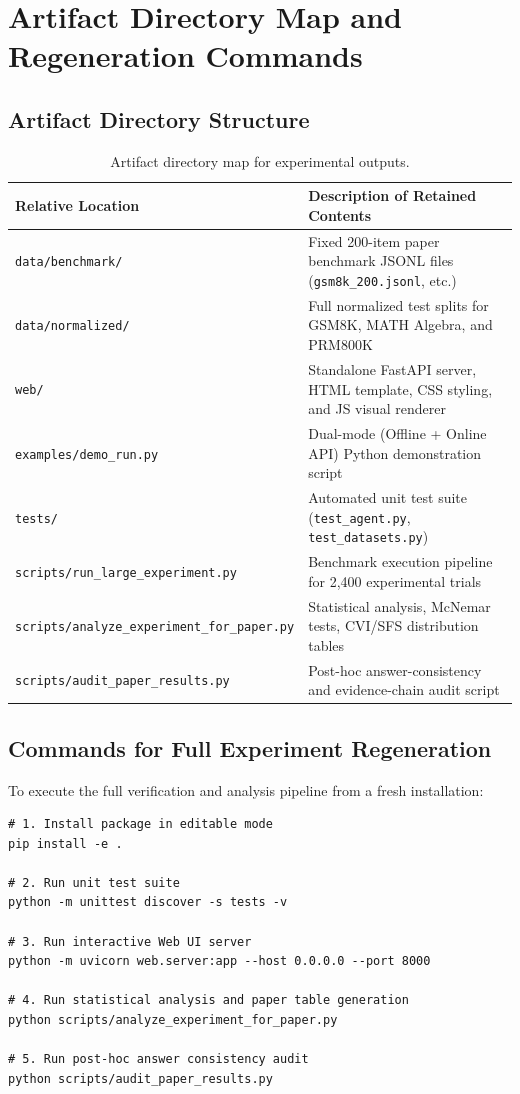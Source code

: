 \documentclass[11pt,letterpaper]{article}
\begin{document}
\section{Artifact Directory Map and Regeneration Commands}\label{sec:artifact-map}

\subsection{Artifact Directory Structure}
\begin{table}[htbp]
\centering
\small
\caption{Artifact directory map for experimental outputs.}
\label{tab:artifact-directory-map}
\begin{tabular}{ll}
\toprule
Relative Location & Description of Retained Contents \\
\midrule
\texttt{data/benchmark/} & Fixed 200-item paper benchmark JSONL files (\texttt{gsm8k\_200.jsonl}, etc.) \\
\texttt{data/normalized/} & Full normalized test splits for GSM8K, MATH Algebra, and PRM800K \\
\texttt{web/} & Standalone FastAPI server, HTML template, CSS styling, and JS visual renderer \\
\texttt{examples/demo\_run.py} & Dual-mode (Offline + Online API) Python demonstration script \\
\texttt{tests/} & Automated unit test suite (\texttt{test\_agent.py}, \texttt{test\_datasets.py}) \\
\texttt{scripts/run\_large\_experiment.py} & Benchmark execution pipeline for 2,400 experimental trials \\
\texttt{scripts/analyze\_experiment\_for\_paper.py} & Statistical analysis, McNemar tests, CVI/SFS distribution tables \\
\texttt{scripts/audit\_paper\_results.py} & Post-hoc answer-consistency and evidence-chain audit script \\
\bottomrule
\end{tabular}
\end{table}

\subsection{Commands for Full Experiment Regeneration}
To execute the full verification and analysis pipeline from a fresh installation:

\begin{verbatim}
# 1. Install package in editable mode
pip install -e .

# 2. Run unit test suite
python -m unittest discover -s tests -v

# 3. Run interactive Web UI server
python -m uvicorn web.server:app --host 0.0.0.0 --port 8000

# 4. Run statistical analysis and paper table generation
python scripts/analyze_experiment_for_paper.py

# 5. Run post-hoc answer consistency audit
python scripts/audit_paper_results.py
\end{verbatim}
\end{document}
